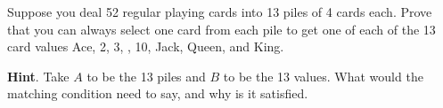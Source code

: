 \documentclass{book}
\begin{document}
\setcounter{cpjt}{61}
\addtocounter{cpjt}{-1}
\begin{activity}\label{activity-54}
\hypertarget{p-458}{}%
Suppose you deal 52 regular playing cards into 13 piles of 4 cards each. Prove that you can always select one card from each pile to get one of each of the 13 card values Ace, 2, 3, \textellipsis{}, 10, Jack, Queen, and King.%
\par\smallskip%
\noindent\textbf{Hint}.\hypertarget{hint-25}{}\quad%
\hypertarget{p-459}{}%
Take \(A\) to be the 13 piles and \(B\) to be the 13 values.  What would the matching condition need to say, and why is it satisfied.%
\par\smallskip%
\noindent\end{activity}

\clearpage
\end{document}
